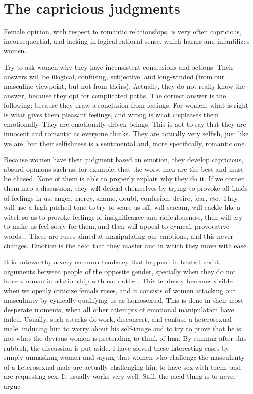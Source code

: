 \section{The capricious judgments}

\par Female opinion, with respect to romantic relationships, is very often capricious, inconsequential, and lacking in logical-rational sense, which harms and infantilizes women.

\par Try to ask women why they have inconsistent conclusions and actions. Their answers will be illogical, confusing, subjective, and long-winded (from our masculine viewpoint, but not from theirs). Actually, they do not really know the answer, because they opt for complicated paths. The correct answer is the following: because they draw a conclusion from feelings. For women, what is right is what gives them pleasant feelings, and wrong is what displeases them emotionally. They are emotionally-driven beings. This is not to say that they are innocent and romantic as everyone thinks. They are actually very selfish, just like we are, but their selfishness is a sentimental and, more specifically, romantic one.

\par Because women have their judgment based on emotion, they develop capricious, absurd opinions such as, for example, that the worst men are the best and must be chased. None of them is able to properly explain why they do it. If we corner them into a discussion, they will defend themselves by trying to provoke all kinds of feelings in us: anger, mercy, shame, doubt, confusion, desire, fear, etc. They will use a high-pitched tone to try to scare us off, will scream, will cackle like a witch so as to provoke feelings of insignificance and ridiculousness, then will cry to make us feel sorry for them, and then will appeal to cynical, provocative words... These are ruses aimed at manipulating our emotions, and this never changes. Emotion is the field that they master and in which they move with ease.

\par It is noteworthy a very common tendency that happens in heated sexist arguments between people of the opposite gender, specially when they do not have a romantic relationship with each other. This tendency becomes visible when we openly criticize female ruses, and it consists of women attacking our masculinity by cynically qualifying us as homosexual. This is done in their most desperate moments, when all other attempts of emotional manipulation have failed. Usually, such attacks do work, disconcert, and confuse a heterosexual male, inducing him to worry about his self-image and to try to prove that he is not what the devious women is pretending to think of him. By running after this rubbish, the discussion is put aside. I have solved these interesting cases by simply unmasking women and saying that women who challenge the masculinity of a heterosexual male are actually challenging him to have sex with them, and are requesting sex. It usually works very well. Still, the ideal thing is to never argue.

